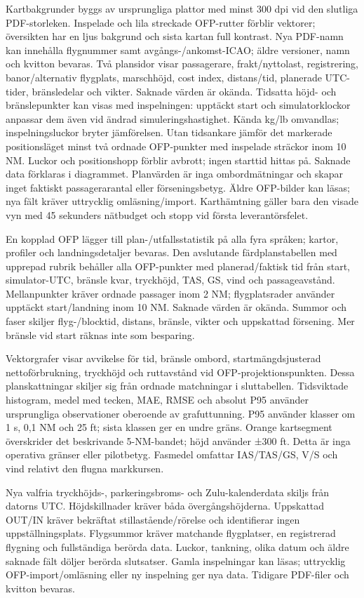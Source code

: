 \documentclass[11pt,a4paper]{article}
\begin{document}
Kartbakgrunder byggs av ursprungliga plattor med minst 300 dpi vid den
slutliga PDF-storleken. Inspelade och lila streckade OFP-rutter förblir
vektorer;
översikten har en ljus bakgrund och sista kartan full kontrast. Nya PDF-namn kan
innehålla flygnummer samt avgångs-/ankomst-ICAO; äldre versioner, namn och
kvitton
bevaras. Två plansidor visar passagerare, frakt/nyttolast, registrering,
banor/alternativ flygplats, marschhöjd, cost index, distans/tid, planerade
UTC-tider, bränsledelar och vikter. Saknade värden är okända. Tidsatta höjd- och
bränslepunkter kan visas med inspelningen: upptäckt start och simulatorklockor
anpassar dem även vid ändrad simuleringshastighet. Kända kg/lb omvandlas;
inspelningsluckor bryter jämförelsen. Utan tidsankare jämför det markerade
positionsläget minst två ordnade OFP-punkter med inspelade sträckor inom 10 NM.
Luckor och positionshopp förblir avbrott; ingen starttid hittas på. Saknade data
förklaras i diagrammet. Planvärden är inga ombordmätningar och skapar inget
faktiskt passagerarantal eller förseningsbetyg. Äldre OFP-bilder kan läsas;
nya fält kräver uttrycklig omläsning/import. Karthämtning gäller bara den visade
vyn med 45 sekunders nätbudget och stopp vid första leverantörsfelet.

En kopplad OFP lägger till plan-/utfallsstatistik på alla fyra språken;
kartor, profiler och landningsdetaljer bevaras. Den avslutande färdplanstabellen
med upprepad rubrik behåller alla OFP-punkter med planerad/faktisk tid från
start, simulator-UTC, bränsle kvar, tryckhöjd, TAS, GS, vind och passageavstånd.
Mellanpunkter kräver ordnade passager inom 2 NM; flygplatsrader använder
upptäckt start/landning inom 10 NM. Saknade värden är okända. Summor och faser
skiljer flyg-/blocktid, distans, bränsle, vikter och uppskattad försening.
Mer bränsle vid start räknas inte som besparing.

Vektorgrafer visar avvikelse för tid, bränsle ombord, startmängdsjusterad
nettoförbrukning, tryckhöjd och ruttavstånd vid OFP-projektionspunkten.
Dessa planskattningar skiljer sig från ordnade matchningar i sluttabellen.
Tidsviktade histogram, medel med tecken, MAE, RMSE och absolut P95 använder
ursprungliga observationer oberoende av grafuttunning. P95 använder klasser
om 1 s, 0,1 NM och 25 ft; sista klassen ger en undre gräns. Orange kartsegment
överskrider det beskrivande 5-NM-bandet; höjd använder ±300 ft. Detta är inga
operativa gränser eller pilotbetyg. Fasmedel omfattar IAS/TAS/GS, V/S och vind
relativt den flugna markkursen.

Nya valfria tryckhöjds-, parkeringsbroms- och Zulu-kalenderdata skiljs från
datorns UTC. Höjdskillnader kräver båda övergångshöjderna. Uppskattad OUT/IN
kräver bekräftat stillastående/rörelse och identifierar ingen
uppställningsplats.
Flygsummor kräver matchande flygplatser, en registrerad flygning och
fullständiga
berörda data. Luckor, tankning, olika datum och äldre saknade fält döljer
berörda
slutsatser. Gamla inspelningar kan läsas; uttrycklig OFP-import/omläsning eller
ny inspelning ger nya data. Tidigare PDF-filer och kvitton bevaras.
\end{document}
